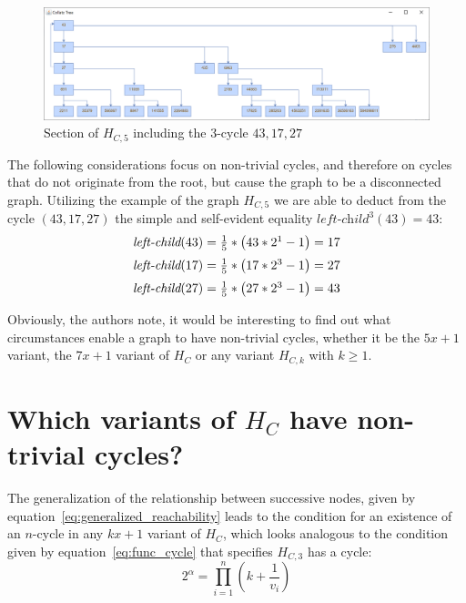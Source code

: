 \begin{figure}
	\includegraphics[width=1.00\textwidth]{figures/h_c5a.png}
	\caption{Section of $H_{C,5}$ including the $3$-cycle $43,17,27$}
	\label{fig:5}
\end{figure}

The following considerations focus on non-trivial cycles, and therefore on cycles that do not originate from the root, but cause the graph to be a disconnected graph. Utilizing the example of the graph $H_{C,5}$ we are able to deduct from the cycle $(43,17,27)$ the simple and self-evident equality $\textit{left-child}^3(43)=43$:
\begin{equation*}
\begin{array}{l}
\textit{left-child}(43)=\frac{1}{5}*\left(43*2^1-1\right)=17
\\[\medskipamount]
\textit{left-child}(17)=\frac{1}{5}*\left(17*2^3-1\right)=27
\\[\medskipamount]
\textit{left-child}(27)=\frac{1}{5}*\left(27*2^3-1\right)=43
\end{array}
\end{equation*}

Obviously, the authors note, it would be interesting to find out what circumstances enable a graph to have non-trivial cycles, whether it be the $5x+1$ variant, the $7x+1$ variant of $H_C$ or any variant $H_{C,k}$ with $k\geq 1$.

\section{\texorpdfstring{Which variants of $H_C$ have non-trivial cycles?}{Which variants of HC have non-trivial cycles?}}
\label{sec:non_trivial_cycles}
The generalization of the relationship between successive nodes, given by equation~\ref{eq:generalized_reachability} leads to the condition for an existence of an $n$-cycle in any $kx+1$ variant of $H_C$, which looks analogous to the condition given by equation~\ref{eq:func_cycle} that specifies $H_{C,3}$ has a cycle:
\begin{equation}
\label{eq:generalized_cycle}
2^\alpha=\prod_{i=1}^{n}\left(k+\frac{1}{v_i}\right)
\end{equation}

